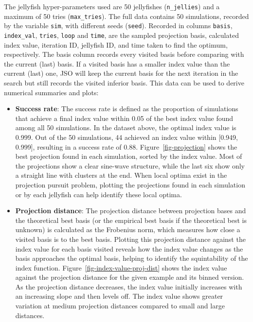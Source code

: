 \documentclass[
  number,
  preprint,
  3p]{elsarticle}
\begin{document}
The jellyfish hyper-parameters used are 50 jellyfishes
(\texttt{n\_jellies}) and a maximum of 50 tries (\texttt{max\_tries}).
The full data contains 50 simulations, recorded by the variable
\texttt{sim}, with different seeds (\texttt{seed}). Recorded in columns
\texttt{basis}, \texttt{index\_val}, \texttt{tries}, \texttt{loop} and
\texttt{time}, are the sampled projection basis, calculated index value,
iteration ID, jellyfish ID, and time taken to find the optimum,
respectively. The basis column records every visited basis before
comparing with the current (last) basis. If a visited basis has a
smaller index value than the current (last) one, JSO will keep the
current basis for the next iteration in the search but still records the
visited inferior basis. This data can be used to derive numerical
summaries and plots:

\begin{itemize}
\item
  \textbf{Success rate}: The success rate is defined as the proportion
  of simulations that achieve a final index value within 0.05 of the
  best index value found among all 50 simulations. In the dataset above,
  the optimal index value is 0.999. Out of the 50 simulations, 44
  achieved an index value within {[}0.949, 0.999{]}, resulting in a
  success rate of 0.88. Figure~\ref{fig-projection} shows the best
  projection found in each simulation, sorted by the index value. Most
  of the projections show a clear sine-wave structure, while the last
  six show only a straight line with clusters at the end. When local
  optima exist in the projection pursuit problem, plotting the
  projections found in each simulation or by each jellyfish can help
  identify these local optima.
\item
  \textbf{Projection distance}: The projection distance between
  projection bases and the theoretical best basis (or the empirical best
  basis if the theoretical best is unknown) is calculated as the
  Frobenius norm, which measures how close a visited basis is to the
  best basis. Plotting this projection distance against the index value
  for each basis visited reveals how the index value changes as the
  basis approaches the optimal basis, helping to identify the
  squintability of the index function.
  Figure~\ref{fig-index-value-proj-dist} shows the index value against
  the projection distance for the given example and its binned version.
  As the projection distance decreases, the index value initially
  increases with an increasing slope and then levels off. The index
  value shows greater variation at medium projection distances compared
  to small and large distances.
\end{itemize}
\end{document}
